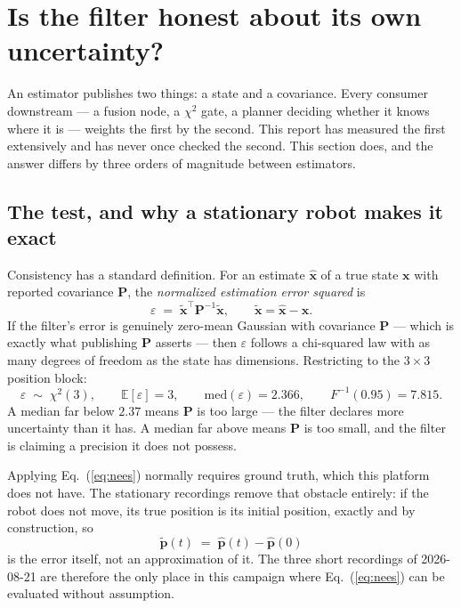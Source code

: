 \section{Is the filter honest about its own uncertainty?}
\label{sec:nees}

An estimator publishes two things: a state and a covariance. Every
consumer downstream --- a fusion node, a $\chi^2$ gate, a planner deciding
whether it knows where it is --- weights the first by the second. This
report has measured the first extensively and has never once checked the
second. This section does, and the answer differs by three orders of
magnitude between estimators.

\subsection{The test, and why a stationary robot makes it exact}

Consistency has a standard definition. For an estimate $\hat{\mathbf{x}}$
of a true state $\mathbf{x}$ with reported covariance $\mathbf{P}$, the
\emph{normalized estimation error squared} is
\begin{equation}
\varepsilon \;=\; \tilde{\mathbf{x}}^{\top}\mathbf{P}^{-1}\tilde{\mathbf{x}},
\qquad \tilde{\mathbf{x}} = \hat{\mathbf{x}} - \mathbf{x} .
\label{eq:nees}
\end{equation}
If the filter's error is genuinely zero-mean Gaussian with covariance
$\mathbf{P}$ --- which is exactly what publishing $\mathbf{P}$ asserts ---
then $\varepsilon$ follows a chi-squared law with as many degrees of freedom
as the state has dimensions. Restricting to the $3\times3$ position block:
\begin{equation}
\varepsilon \;\sim\; \chi^2(3),
\qquad
\mathbb{E}[\varepsilon] = 3,
\qquad
\mathrm{med}(\varepsilon) = 2.366,
\qquad
F^{-1}(0.95) = 7.815 .
\label{eq:chi3}
\end{equation}
A median far below $2.37$ means $\mathbf{P}$ is too large --- the filter
declares more uncertainty than it has. A median far above means
$\mathbf{P}$ is too small, and the filter is claiming a precision it does
not possess.

Applying Eq.~(\ref{eq:nees}) normally requires ground truth, which this
platform does not have. The stationary recordings remove that obstacle
entirely: if the robot does not move, its true position is its initial
position, exactly and by construction, so
\begin{equation}
\tilde{\mathbf{p}}(t) \;=\; \hat{\mathbf{p}}(t) - \hat{\mathbf{p}}(0)
\end{equation}
is the error itself, not an approximation of it. The three short recordings
of 2026-08-21 are therefore the only place in this campaign where
Eq.~(\ref{eq:nees}) can be evaluated without assumption.


